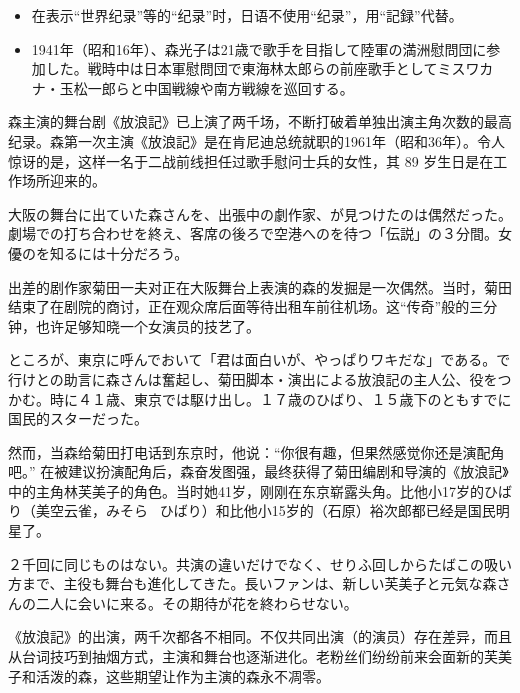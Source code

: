 \documentclass{ctexart}
\newcommand{\bbigbreak}{\bigbreak \bigbreak}
\begin{document}
\begin{itemize}
    \rmfamily
    \item 在表示“世界纪录”等的“纪录”时，日语不使用“纪录”，用“記録”代替。
    \mincho
    \item 1941年（昭和16年）、森光子は21歳で歌手を目指して陸軍の満洲慰問団に参加した。戦時中は日本軍慰問団で東海林太郎らの前座歌手としてミスワカナ・玉松一郎らと中国戦線や南方戦線を巡回する。
\end{itemize}

\rmfamily
森主演的舞台剧《放浪記》已上演了两千场，不断打破着单独出演主角次数的最高纪录。森第一次主演《放浪記》是在肯尼迪总统就职的1961年（昭和36年）。令人惊讶的是，这样一名于二战前线担任过歌手慰问士兵的女性，其 89 岁生日是在工作场所迎来的。

\bbigbreak

\mincho
大阪の舞台に出ていた森さんを、出張中の劇作家、が見つけたのは偶然だった。劇場での打ち合わせを終え、客席の後ろで空港へのを待つ「伝説」の３分間。女優のを知るには十分だろう。

\rmfamily
出差的剧作家菊田一夫对正在大阪舞台上表演的森的发掘是一次偶然。当时，菊田结束了在剧院的商讨，正在观众席后面等待出租车前往机场。这“传奇”般的三分钟，也许足够知晓一个女演员的技艺了。

\bbigbreak

\mincho
ところが、東京に呼んでおいて「君は面白いが、やっぱりワキだな」である。で行けとの助言に森さんは奮起し、菊田脚本・演出による放浪記の主人公、役をつかむ。時に４１歳、東京では駆け出し。１７歳のひばり、１５歳下のともすでに国民的スターだった。

\rmfamily
然而，当森给菊田打电话到东京时，他说：“你很有趣，但果然感觉你还是演配角吧。” 在被建议扮演配角后，森奋发图强，最终获得了菊田编剧和导演的《放浪記》中的主角林芙美子的角色。当时她41岁，刚刚在东京崭露头角。比他小17岁的ひばり（美空云雀，みそら \ ひばり）和比他小15岁的（石原）裕次郎都已经是国民明星了。

\bbigbreak

\mincho
２千回に同じものはない。共演の違いだけでなく、せりふ回しからたばこの吸い方まで、主役も舞台も進化してきた。長いファンは、新しい芙美子と元気な森さんの二人に会いに来る。その期待が花を終わらせない。

\rmfamily
《放浪記》的出演，两千次都各不相同。不仅共同出演（的演员）存在差异，而且从台词技巧到抽烟方式，主演和舞台也逐渐进化。老粉丝们纷纷前来会面新的芙美子和活泼的森，这些期望让作为主演的森永不凋零。
\end{document}
